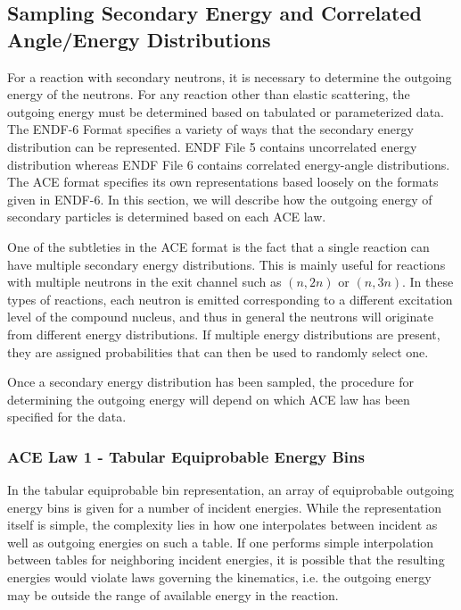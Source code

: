 \subsection{Sampling Secondary Energy and Correlated Angle/Energy Distributions}
\label{sec:sample-energy}

For a reaction with secondary neutrons, it is necessary to determine the
outgoing energy of the neutrons. For any reaction other than elastic scattering,
the outgoing energy must be determined based on tabulated or parameterized
data. The ENDF-6 Format \cite{bnl-herman-2009} specifies a variety of ways that
the secondary energy distribution can be represented. ENDF File 5 contains
uncorrelated energy distribution whereas ENDF File 6 contains correlated
energy-angle distributions. The ACE format specifies its own representations
based loosely on the formats given in ENDF-6. In this section, we will describe
how the outgoing energy of secondary particles is determined based on each ACE
law.

One of the subtleties in the ACE format is the fact that a single reaction can
have multiple secondary energy distributions. This is mainly useful for
reactions with multiple neutrons in the exit channel such as $(n,2n)$ or
$(n,3n)$. In these types of reactions, each neutron is emitted corresponding to
a different excitation level of the compound nucleus, and thus in general the
neutrons will originate from different energy distributions. If multiple energy
distributions are present, they are assigned probabilities that can then be used
to randomly select one.

Once a secondary energy distribution has been sampled, the procedure for
determining the outgoing energy will depend on which ACE law has been specified
for the data.

\subsubsection{ACE Law 1 - Tabular Equiprobable Energy Bins}
\label{sec:ace-law-1}

In the tabular equiprobable bin representation, an array of equiprobable
outgoing energy bins is given for a number of incident energies. While the
representation itself is simple, the complexity lies in how one interpolates
between incident as well as outgoing energies on such a table. If one performs
simple interpolation between tables for neighboring incident energies, it is
possible that the resulting energies would violate laws governing the
kinematics, i.e. the outgoing energy may be outside the range of available
energy in the reaction.


